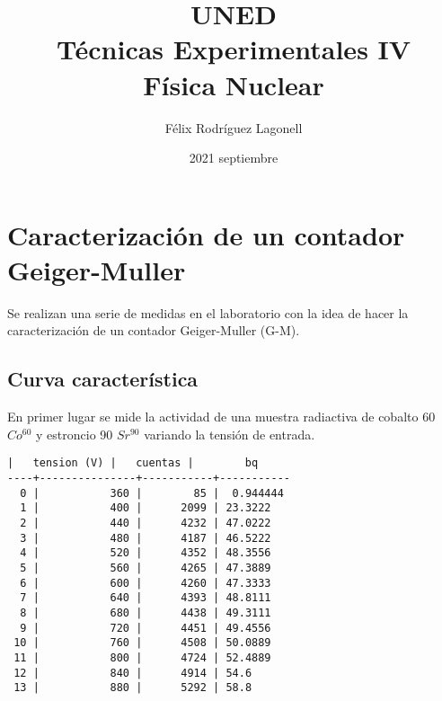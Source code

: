 \documentclass[11pt]{article}
\title{UNED \\ Técnicas Experimentales IV \\ \large Física Nuclear}
\author{Félix Rodríguez Lagonell}
\date{2021 septiembre}
\begin{document}
    
    \maketitle
    
    

    
    \hypertarget{caracterizaciuxf3n-de-un-contador-geiger-muller}{%
\section{Caracterización de un contador
Geiger-Muller}\label{caracterizaciuxf3n-de-un-contador-geiger-muller}}

Se realizan una serie de medidas en el laboratorio con la idea de hacer
la caracterización de un contador Geiger-Muller (G-M).

    \hypertarget{curva-caracteruxedstica}{%
\subsection{Curva característica}\label{curva-caracteruxedstica}}

En primer lugar se mide la actividad de una muestra radiactiva de
cobalto 60 \(Co^{60}\) y estroncio 90 \(Sr^{90}\) variando la tensión de
entrada.

    \begin{Verbatim}[commandchars=\\\{\}]
    |   tension (V) |   cuentas |        bq
----+---------------+-----------+-----------
  0 |           360 |        85 |  0.944444
  1 |           400 |      2099 | 23.3222
  2 |           440 |      4232 | 47.0222
  3 |           480 |      4187 | 46.5222
  4 |           520 |      4352 | 48.3556
  5 |           560 |      4265 | 47.3889
  6 |           600 |      4260 | 47.3333
  7 |           640 |      4393 | 48.8111
  8 |           680 |      4438 | 49.3111
  9 |           720 |      4451 | 49.4556
 10 |           760 |      4508 | 50.0889
 11 |           800 |      4724 | 52.4889
 12 |           840 |      4914 | 54.6
 13 |           880 |      5292 | 58.8
    \end{Verbatim}

    \begin{center}
    \end{center}
    { \hspace*{\fill} \\}
     
            
    
\end{document}

